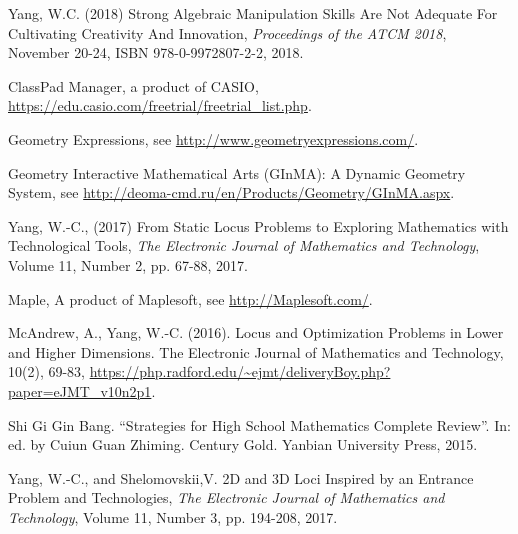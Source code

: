 \documentclass[12pt,a4paper]{article}%
\begin{document}
\begin{thebibliography}{9}                                                                                                %
Yang, W.C. (2018) Strong Algebraic Manipulation Skills Are
Not Adequate For Cultivating Creativity And Innovation, \textit{Proceedings of
the ATCM 2018}, November 20-24, ISBN 978-0-9972807-2-2, 2018.

ClassPad Manager, a product of CASIO, \url{https://edu.casio.com/freetrial/freetrial\_list.php}.

Geometry Expressions, see \url{http://www.geometryexpressions.com/}.

Geometry Interactive Mathematical Arts (GInMA): A Dynamic
Geometry System, see \url{http://deoma-cmd.ru/en/Products/Geometry/GInMA.aspx}.

Yang, W.-C., (2017) From Static Locus Problems to Exploring
Mathematics with Technological Tools, \textit{The Electronic Journal of
Mathematics and Technology}, Volume 11, Number 2, pp. 67-88, 2017.

Maple, A product of Maplesoft, see \url{http://Maplesoft.com/}.

McAndrew, A., Yang, W.-C. (2016). Locus and Optimization
Problems in Lower and Higher Dimensions. The Electronic Journal of Mathematics
and Technology, 10(2), 69-83,
\url{https://php.radford.edu/~ejmt/deliveryBoy.php?paper=eJMT\_v10n2p1}.

Shi Gi Gin Bang. \textquotedblleft Strategies for High School
Mathematics Complete Review\textquotedblright. In: ed. by Cuiun Guan Zhiming.
Century Gold. Yanbian University Press, 2015.

Yang, W.-C., and Shelomovskii,V. 2D and 3D Loci Inspired by
an Entrance Problem and Technologies, \textit{The Electronic Journal of
Mathematics and Technology}, Volume 11, Number 3, pp. 194-208, 2017.
\end{thebibliography}
\end{document}
